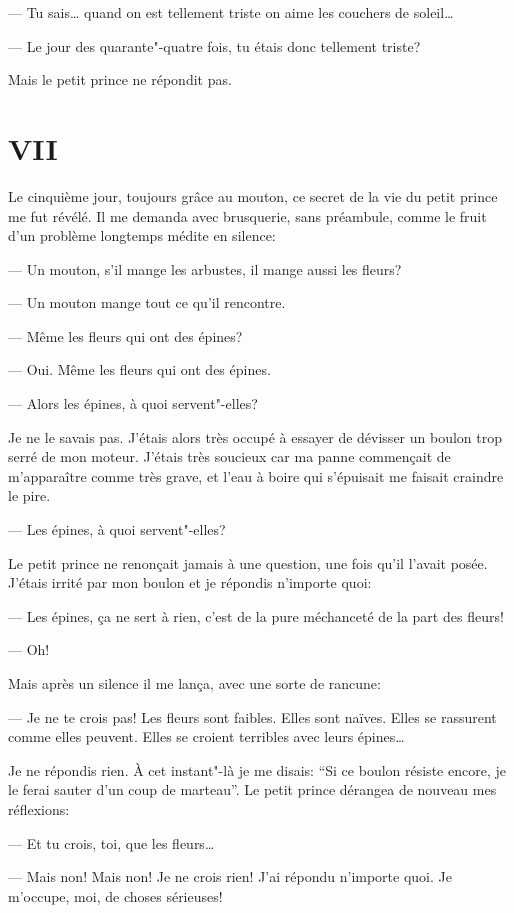 \begin{Parallel}[p]{}{}
{--- Tu sais\ldots{} quand on est tellement triste on aime
les couchers de soleil\ldots{}

--- Le jour des quarante"-quatre fois, tu étais donc
tellement triste?

Mais le petit prince ne répondit pas.

\section{VII}

Le cinquième jour, toujours grâce au mouton, ce
secret de la vie du petit prince me fut révélé. Il
me demanda avec brusquerie, sans préambule,
comme le fruit d'un problème longtemps médite en
silence:

--- Un mouton, s'il mange les arbustes, il mange
aussi les fleurs?

--- Un mouton mange tout ce qu'il rencontre.

--- Même les fleurs qui ont des épines?

--- Oui. Même les fleurs qui ont des épines.

--- Alors les épines, à quoi servent"-elles?

Je ne le savais pas. J'étais alors très occupé à essayer de dévisser un boulon trop serré de mon
moteur. J'étais très soucieux car ma panne commençait de m'apparaître comme très grave, et l'eau à
boire qui s'épuisait me faisait craindre le pire.

--- Les épines, à quoi servent"-elles?

Le petit prince ne renonçait jamais à une question, une fois qu'il l'avait posée. J'étais irrité par
mon boulon et je répondis n'importe quoi:

--- Les épines, ça ne sert à rien, c'est de la pure méchanceté de la part des fleurs!

--- Oh!

Mais après un silence il me lança, avec une sorte
de rancune:

--- Je ne te crois pas! Les fleurs sont faibles. Elles
sont naïves. Elles se rassurent comme elles peuvent.
Elles se croient terribles avec leurs épines\ldots{}

Je ne répondis rien. À cet instant"-là je me disais: ``Si ce boulon résiste encore, je le ferai sauter d'un
coup de marteau''. Le petit prince dérangea de nouveau mes réflexions:

--- Et tu crois, toi, que les fleurs\ldots{}

--- Mais non! Mais non! Je ne crois rien! J'ai
répondu n'importe quoi. Je m'occupe, moi, de
choses sérieuses!

}
\end{Parallel}
